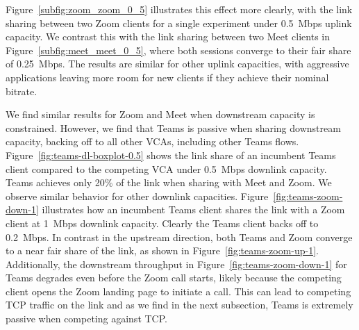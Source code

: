 Figure~\ref{subfig:zoom_zoom_0_5} illustrates this effect more clearly, with
the link sharing between two Zoom clients for a single experiment under
0.5~Mbps uplink capacity. We contrast this with the link sharing between two
Meet clients in Figure~\ref{subfig:meet_meet_0_5}, where both sessions converge to their
fair share of 0.25~Mbps. The results are similar for other uplink capacities,
with aggressive applications leaving more room for new clients if they achieve
their nominal bitrate. 

We find similar results for Zoom and Meet when downstream capacity is
constrained.
However, we find that Teams is passive when sharing downstream capacity, backing off to
all other VCAs, including other Teams flows. Figure~\ref{fig:teams-dl-boxplot-0.5} shows the
link share of an incumbent Teams client compared to the competing VCA under
0.5~Mbps downlink capacity. Teams achieves only 20\% of the link
when sharing with Meet and Zoom. We observe similar behavior for other downlink
capacities. Figure~\ref{fig:teams-zoom-down-1} illustrates how an incumbent
Teams client shares the link with a Zoom client at 1~Mbps downlink capacity.
Clearly the Teams client backs off to 0.2~Mbps. In contrast 
in the upstream direction, both Teams and Zoom converge to a near fair
share of the link, as shown in Figure~\ref{fig:teams-zoom-up-1}. 
Additionally, the downstream throughput in Figure~\ref{fig:teams-zoom-down-1} for Teams
degrades even before the Zoom call starts, likely because the
competing client opens the Zoom landing page to initiate a call. This can lead
to competing TCP traffic on the link and as we find in the next subsection,
Teams is extremely passive when competing against TCP. 



